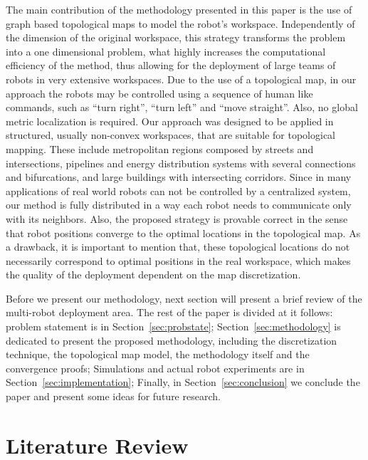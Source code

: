 \documentclass[twocolumn]{svjour3}       %
\begin{document}
The main contribution of the methodology presented in this paper is the use of graph based topological maps to model the robot's workspace. Independently of the dimension of the original workspace, this strategy transforms the problem into a one dimensional problem, what highly increases the computational efficiency of the method, thus allowing for the deployment of large teams of robots in very extensive workspaces. Due to the use of a topological map, in our approach the robots may be controlled using a sequence of human like commands, such as ``turn right'', ``turn left'' and ``move straight''. Also, no global metric localization is required. Our approach  was designed to be applied in structured, usually non-convex workspaces, that are suitable for topological mapping. These include metropolitan regions composed by streets and intersections, pi\-pe\-lines and energy distribution systems with several connections and bifurcations, and large buildings with intersecting corridors. Since in many applications of real world robots can not be controlled by a centralized system, our method is fully distributed  in a way each robot needs to communicate only with its neighbors. Also, the proposed strategy is provable correct in the sense that robot positions converge to the optimal locations in the topological map. As a drawback, it is important to mention that, these topological locations do not necessarily correspond to optimal positions in the real workspace, which makes the quality of the deployment dependent on the map discretization. 

Before we present our methodology, next section will present a brief review of the multi-robot deployment area. The rest of the paper is divided at it follows: problem statement is in Section~\ref{sec:probstate}; Section~\ref{sec:methodology} is dedicated to present the proposed methodology, including the discretization technique, the topological map model, the methodology itself and the convergence proofs; Simulations and actual robot experiments are in Section~\ref{sec:implementation}; Finally, in Section~\ref{sec:conclusion} we conclude the paper and present some ideas for future research.

\section{Literature Review}

\end{document}
